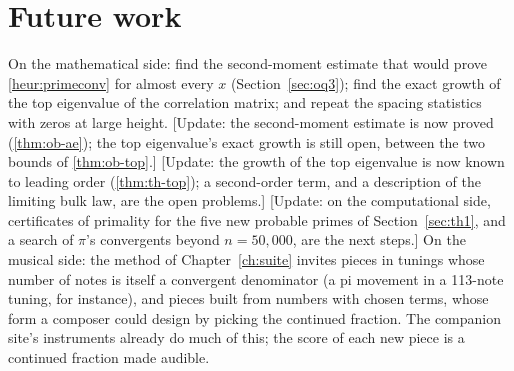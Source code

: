 \section{Future work}

On the mathematical side: find the second-moment estimate that would prove \cref{heur:primeconv} for almost every $x$ (Section~\ref{sec:oq3}); find the exact growth of the top eigenvalue of the correlation matrix; and repeat the spacing statistics with zeros at large height. \addedon{\revA} [Update: the second-moment estimate is now proved (\cref{thm:ob-ae}); the top eigenvalue's exact growth is still open, between the two bounds of \cref{thm:ob-top}.] \addedon{\revB} [Update: the growth of the top eigenvalue is now known to leading order (\cref{thm:th-top}); a second-order term, and a description of the limiting bulk law, are the open problems.] \addedon{\revC} [Update: on the computational side, certificates of primality for the five new probable primes of Section~\ref{sec:th1}, and a search of $\pi$'s convergents beyond $n = 50{,}000$, are the next steps.] \addedon{\revC} On the musical side: the method of Chapter~\ref{ch:suite} invites pieces in tunings whose number of notes is itself a convergent denominator (a pi movement in a 113-note tuning, for instance), and pieces built from numbers with chosen terms, whose form a composer could design by picking the continued fraction. The companion site's instruments already do much of this; the score of each new piece is a continued fraction made audible.

